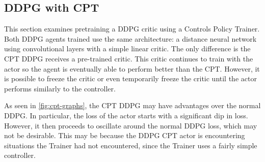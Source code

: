 \subsection{DDPG with CPT}\label{subsec:ddpg-with-cpt}
This section examines pretraining a DDPG critic using a Controls Policy Trainer.
Both DDPG agents trained use the same architecture: a distance neural network using
convolutional layers with a simple linear critic.
The only difference is the CPT DDPG receives a pre-trained critic.
This critic continues to train with the actor so the agent is eventually able to
perform better than the CPT\@.
However, it is possible to freeze the critic or even temporarily freeze the critic
until the actor performs similarly to the controller.

As seen in \autoref{fig:cpt-graphs}, the CPT DDPG may have advantages over the normal
DDPG\@.
In particular, the loss of the actor starts with a significant dip in loss.
However, it then proceeds to oscillate around the normal DDPG loss, which may not be
desirable.
This may be because the DDPG CPT actor is encountering situations the Trainer had not
encountered, since the Trainer uses a fairly simple controller.

